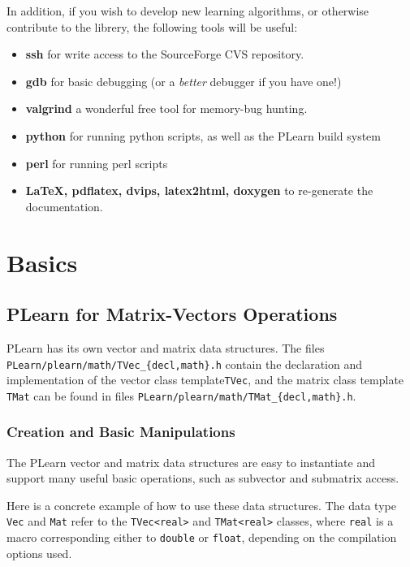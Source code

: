 \documentclass[11pt]{book}
\begin{document}
In addition, if you wish to develop new learning algorithms, or otherwise
 contribute to the librery, the following tools will be useful:
\begin{itemize}
\item {\bf ssh} for write access to the SourceForge CVS repository.
\item {\bf gdb} for basic debugging (or a {\em better} debugger if you have one!)
\item {\bf valgrind} a wonderful free tool for memory-bug hunting.
\item {\bf python} for running python scripts, as well as the PLearn build system
\item {\bf perl} for running perl scripts
\item {\bf LaTeX, pdflatex, dvips, latex2html, doxygen} to re-generate the documentation. 
\end{itemize}



\chapter{Basics}

\section{PLearn for Matrix-Vectors Operations}

PLearn has its own vector and matrix data structures.
The files \texttt{PLearn/plearn/math/TVec\_\{decl,math\}.h}
contain the declaration and implementation of the
vector class template\texttt{TVec}, and the matrix
class template \texttt{TMat} can be found
in files \texttt{PLearn/plearn/math/TMat\_\{decl,math\}.h}.

\subsection{Creation and Basic Manipulations}

The PLearn vector and matrix data structures
are easy to instantiate and
support many useful basic operations, such
as subvector and submatrix access.

Here is a concrete example of how to use
these data structures.
The data type \texttt{Vec} and \texttt{Mat} refer to the \texttt{TVec<real>}
and \texttt{TMat<real>} classes, where \texttt{real} is a macro
corresponding either to \texttt{double} or \texttt{float}, depending
on the compilation options used.
\end{document}
